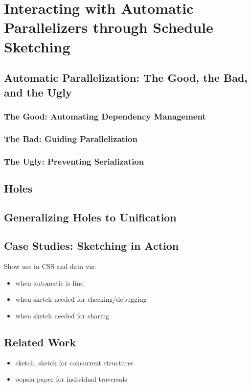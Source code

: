 
\chapter{Interacting with Automatic Parallelizers through Schedule Sketching}
\label{chap:4}

\section{Automatic Parallelization: The Good, the Bad, and the Ugly}

\subsection{The Good: Automating Dependency Management}
\subsection{The Bad: Guiding Parallelization}
\subsection{The Ugly: Preventing Serialization}

\section{Holes}
\section{Generalizing Holes to Unification}

\section{Case Studies: Sketching in Action}
Show use in CSS and data viz: 
\begin{itemize}
\item when automatic is fine
\item when sketch needed for checking/debugging
\item when sketch needed for sharing
\end{itemize}

\section{Related Work}
\begin{itemize}
\item sketch, sketch for concurrent structures
\item oopsla paper for individual traversals
\end{itemize}
